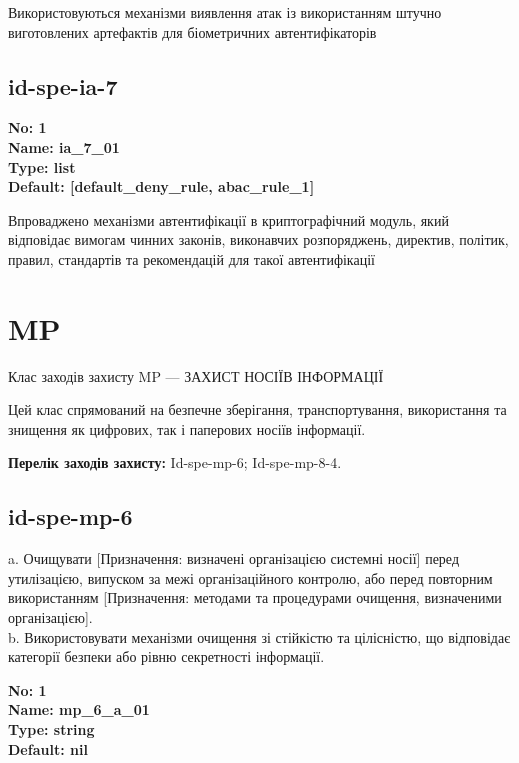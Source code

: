 \documentclass{article}
\begin{document}
{\footnotesize Використовуються механізми виявлення атак із використанням штучно виготовлених артефактів для біометричних автентифікаторів}




\subsection{id-spe-ia-7}


\vspace{10pt}
{\footnotesize\bfseries
No: 1\\
Name: ia\_\allowbreak{}7\_\allowbreak{}01\\
Type: list\\
Default: [\textquotedbl{}default\_\allowbreak{}deny\_\allowbreak{}rule\textquotedbl{}, \textquotedbl{}abac\_\allowbreak{}rule\_\allowbreak{}1\textquotedbl{}]
}

{\footnotesize Впроваджено механізми автентифікації в криптографічний модуль, який відповідає вимогам чинних законів, виконавчих розпоряджень, директив, політик, правил, стандартів та рекомендацій для такої автентифікації}




\section{MP}
Клас заходів захисту MP --- ЗАХИСТ НОСІЇВ ІНФОРМАЦІЇ

Цей клас спрямований на безпечне зберігання, транспортування, використання та знищення як цифрових, так і паперових носіїв інформації.

\textbf{Перелік заходів захисту:} Id-spe-mp-6; Id-spe-mp-8-4.

\subsection{id-spe-mp-6}
a. Очищувати [Призначення: визначені організацією системні носії] перед утилізацією, випуском за межі організаційного контролю, або перед повторним використанням [Призначення: методами та процедурами очищення, визначеними організацією].\\ 
b. Використовувати механізми очищення зі стійкістю та цілісністю, що відповідає категорії безпеки або рівню секретності інформації.

\vspace{10pt}
{\footnotesize\bfseries
No: 1\\
Name: mp\_\allowbreak{}6\_\allowbreak{}a\_\allowbreak{}01\\
Type: string\\
Default: nil
}
\end{document}

